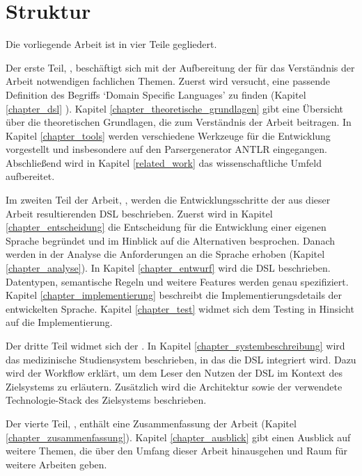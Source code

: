 \section{Struktur}

Die vorliegende Arbeit ist in vier Teile gegliedert.

Der erste Teil, \emph{}, beschäftigt sich mit der Aufbereitung der für das Verständnis der Arbeit notwendigen fachlichen Themen. Zuerst wird versucht, eine passende Definition des Begriffs `Domain Specific Languages' zu finden (Kapitel \ref{chapter_dsl} ). Kapitel \ref{chapter_theoretische_grundlagen} gibt eine Übersicht über die theoretischen Grundlagen, die zum Verständnis der Arbeit beitragen. In Kapitel \ref{chapter_tools} werden verschiedene Werkzeuge für die Entwicklung vor\-ge\-stel\-lt und insbesondere auf den Parsergenerator ANTLR eingegangen. Ab\-schlie\-ßend wird in Kapitel \ref{related_work} das wissenschaftliche Umfeld aufbereitet.

Im zweiten Teil der Arbeit, \emph{}, werden die Entwicklungsschritte der aus dieser Arbeit resultierenden DSL beschrieben. Zuerst wird in Kapitel \ref{chapter_entscheidung} die Entscheidung für die Entwicklung einer eigenen Sprache begründet und im Hinblick auf die Alternativen besprochen. Danach werden in der Analyse die Anforderungen an die Sprache erhoben (Kapitel \ref{chapter_analyse}). In Kapitel \ref{chapter_entwurf} wird die DSL beschrieben. Datentypen, semantische Regeln und weitere Features werden genau spezifiziert. Kapitel \ref{chapter_implementierung} beschreibt die Implementierungsdetails der entwickelten Sprache. Kapitel \ref{chapter_test} widmet sich dem Testing in Hinsicht auf die Implementierung.

Der dritte Teil widmet sich der \emph{}. In Kapitel \ref{chapter_systembeschreibung} wird das medizinische Studiensystem beschrieben, in das die DSL integriert wird. Dazu wird der Workflow erklärt, um dem Leser den Nutzen der DSL im Kontext des Zielsystems zu erläutern. Zusätzlich wird die Architektur sowie der verwendete Technologie-Stack des Zielsystems beschrieben.

Der vierte Teil, \emph{}, enthält eine Zusammenfassung der Arbeit (Kapitel \ref{chapter_zusammenfassung}). Kapitel \ref{chapter_ausblick} gibt einen Ausblick auf weitere Themen, die über den Umfang dieser Arbeit hinausgehen und Raum für weitere Arbeiten geben.




